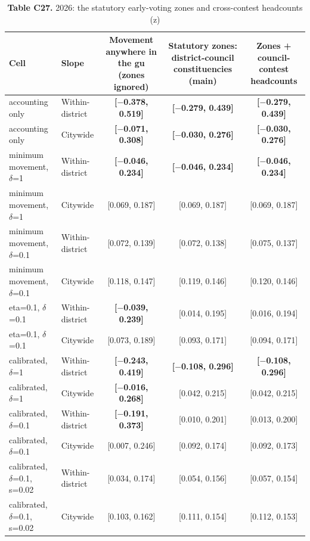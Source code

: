 \begin{table}[!htbp]
\centering
\scriptsize
\setlength{\tabcolsep}{3.5pt}
\caption*{\textbf{Table C27.} 2026: the statutory early-voting zones and cross-contest headcounts (z)}
\begin{tabularx}{\linewidth}{llCCC}
\toprule
Cell & Slope & Movement anywhere in the gu (zones ignored) & Statutory zones: district-council constituencies (main) & Zones + council-contest headcounts \\
\midrule
accounting only & Within-district & \textbf{[$-$0.378, 0.519]} & \textbf{[$-$0.279, 0.439]} & \textbf{[$-$0.279, 0.439]} \\
accounting only & Citywide & \textbf{[$-$0.071, 0.308]} & \textbf{[$-$0.030, 0.276]} & \textbf{[$-$0.030, 0.276]} \\
minimum movement, $\delta $=1 & Within-district & \textbf{[$-$0.046, 0.234]} & \textbf{[$-$0.046, 0.234]} & \textbf{[$-$0.046, 0.234]} \\
minimum movement, $\delta $=1 & Citywide & [0.069, 0.187] & [0.069, 0.187] & [0.069, 0.187] \\
minimum movement, $\delta $=0.1 & Within-district & [0.072, 0.139] & [0.072, 0.138] & [0.075, 0.137] \\
minimum movement, $\delta $=0.1 & Citywide & [0.118, 0.147] & [0.119, 0.146] & [0.120, 0.146] \\
eta=0.1, $\delta $=0.1 & Within-district & \textbf{[$-$0.039, 0.239]} & [0.014, 0.195] & [0.016, 0.194] \\
eta=0.1, $\delta $=0.1 & Citywide & [0.073, 0.189] & [0.093, 0.171] & [0.094, 0.171] \\
calibrated, $\delta $=1 & Within-district & \textbf{[$-$0.243, 0.419]} & \textbf{[$-$0.108, 0.296]} & \textbf{[$-$0.108, 0.296]} \\
calibrated, $\delta $=1 & Citywide & \textbf{[$-$0.016, 0.268]} & [0.042, 0.215] & [0.042, 0.215] \\
calibrated, $\delta $=0.1 & Within-district & \textbf{[$-$0.191, 0.373]} & [0.010, 0.201] & [0.013, 0.200] \\
calibrated, $\delta $=0.1 & Citywide & [0.007, 0.246] & [0.092, 0.174] & [0.092, 0.173] \\
calibrated, $\delta $=0.1, s=0.02 & Within-district & [0.034, 0.174] & [0.054, 0.156] & [0.057, 0.154] \\
calibrated, $\delta $=0.1, s=0.02 & Citywide & [0.103, 0.162] & [0.111, 0.154] & [0.112, 0.153] \\
\bottomrule
\end{tabularx}
\par{}
\end{table}
